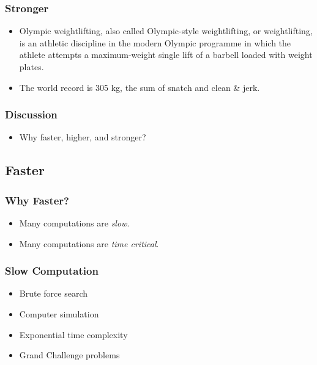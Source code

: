\documentclass{beamer}
\begin{document}
\begin{CJK}{UTF8}{bsmi}
\begin{frame}
\frametitle{Stronger}
\begin{itemize}
\item Olympic weightlifting, also called Olympic-style weightlifting,
  or weightlifting, is an athletic discipline in the modern Olympic
  programme in which the athlete attempts a maximum-weight single lift
  of a barbell loaded with weight plates.
\item The world record is 305 kg, the sum of snatch and clean \& jerk. 
\end{itemize}
\end{frame}

\begin{frame}
\frametitle{Discussion}
\Large 
\begin{itemize}
\item Why faster, higher, and stronger?
\end{itemize}
\end{frame}


\subsection{Faster}

\begin{frame}
\frametitle{Why Faster?}
\begin{itemize}
\item Many computations are {\em slow}.
\item Many computations are {\em time critical}.
\end{itemize}
\end{frame}

\begin{frame}
\frametitle{Slow Computation}
\begin{itemize}
\item Brute force search
\item Computer simulation
\item Exponential time complexity
\item Grand Challenge problems
\end{itemize}
\end{frame}


\end{CJK}
\end{document}
